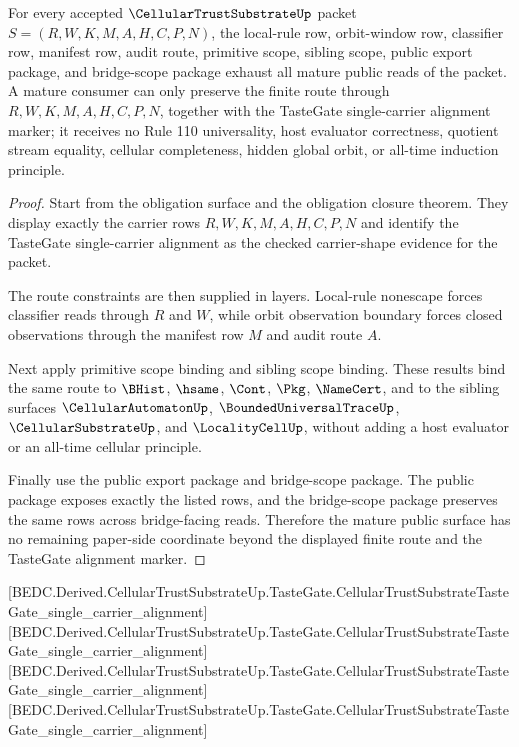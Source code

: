 \begin{theorem}
\label{thm:cellular-trust-substrate-mature-route-completeness}
For every accepted $\CellularTrustSubstrateUp$ packet $S=(R,W,K,M,A,H,C,P,N)$,
the local-rule row, orbit-window row, classifier row, manifest row, audit
route, primitive scope, sibling scope, public export package, and bridge-scope
package exhaust all mature public reads of the packet. A mature consumer can
only preserve the finite route through $R,W,K,M,A,H,C,P,N$, together with the
TasteGate single-carrier alignment marker; it receives no Rule 110
universality, host evaluator correctness, quotient stream equality, cellular
completeness, hidden global orbit, or all-time induction principle.
\end{theorem}
\begin{proof}
Start from the obligation surface and the obligation closure theorem. They
display exactly the carrier rows $R,W,K,M,A,H,C,P,N$ and identify the
TasteGate single-carrier alignment as the checked carrier-shape evidence for
the packet.

The route constraints are then supplied in layers. Local-rule nonescape forces
classifier reads through $R$ and $W$, while orbit observation boundary forces
closed observations through the manifest row $M$ and audit route $A$.

Next apply primitive scope binding and sibling scope binding. These results
bind the same route to $\BHist$, $\hsame$, $\Cont$, $\Pkg$, $\NameCert$, and to
the sibling surfaces $\CellularAutomatonUp$, $\BoundedUniversalTraceUp$,
$\CellularSubstrateUp$, and $\LocalityCellUp$, without adding a host evaluator
or an all-time cellular principle.

Finally use the public export package and bridge-scope package. The public
package exposes exactly the listed rows, and the bridge-scope package
preserves the same rows across bridge-facing reads. Therefore the mature
public surface has no remaining paper-side coordinate beyond the displayed
finite route and the TasteGate alignment marker.
\end{proof}

[BEDC.Derived.CellularTrustSubstrateUp.TasteGate.CellularTrustSubstrateTasteGate\_single\_carrier\_alignment]
[BEDC.Derived.CellularTrustSubstrateUp.TasteGate.CellularTrustSubstrateTasteGate\_single\_carrier\_alignment]
[BEDC.Derived.CellularTrustSubstrateUp.TasteGate.CellularTrustSubstrateTasteGate\_single\_carrier\_alignment]
[BEDC.Derived.CellularTrustSubstrateUp.TasteGate.CellularTrustSubstrateTasteGate\_single\_carrier\_alignment]


